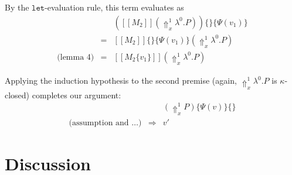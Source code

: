 \documentclass[a4paper,11pt]{article}
\begin{document}
\begin{itemize}
By the $\texttt{let}$-evaluation rule, this term evaluates as
\begin{eqnarray*}
                 &   & ([\![M_{2}]\!](\Uparrow_{x}^{1} \lambda^{0}.P))\{\}\{\Psi(v_{1})\} \\
                 & = & [\![M_{2}]\!]\{\}\{\Psi(v_{1})\}(\Uparrow_{x}^{1} \lambda^{0}.P) \\
\mbox{(lemma 4)} & = & [\![M_{2}\{v_{1}\}]\!](\Uparrow_{x}^{1} \lambda^{0}.P)
\end{eqnarray*}

Applying the induction hypothesis to the second premise (again, $\Uparrow_{x}^{1} \lambda^{0}.P$ is $\kappa$-closed)
completes our argument:
\begin{eqnarray*}
                               &             & (\Uparrow_{x}^{1}P)\{\Psi(v)\}\{\} \\
\mbox{(assumption and \ldots)} & \Rightarrow & v'
\end{eqnarray*}



\end{itemize}


\section{Discussion}\label{sec:discussion}
\end{document}
